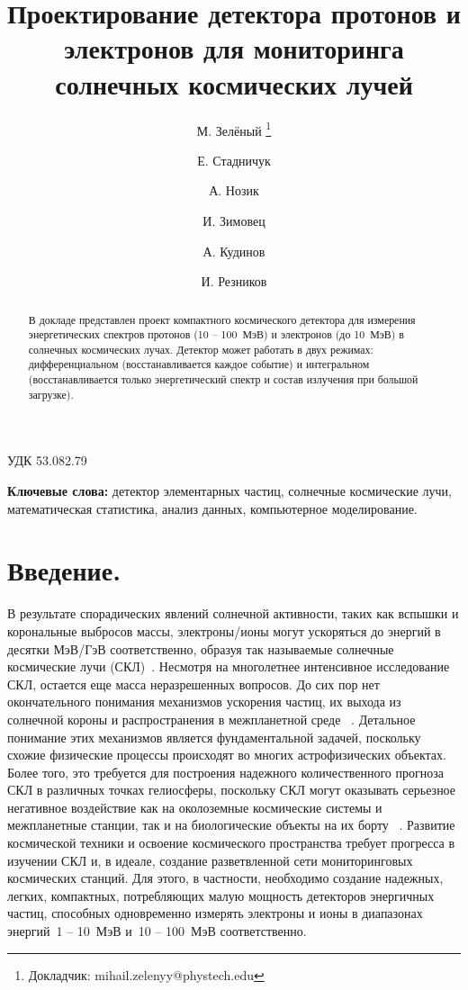 \documentclass[12pt, a4paper, notitlepage, onecolumn]{article}
\begin{document}
\begin{flushright}
УДК {53.082.79}
\end{flushright}
\title{Проектирование детектора протонов и электронов для мониторинга солнечных космических лучей}
\author[1,2,3]{М. Зелёный%
  \thanks{Докладчик: mihail.zelenyy@phystech.edu}}
\author[1,2]{Е. Стадничук}
\author[1,2]{А. Нозик}
\author[3]{И. Зимовец}
\author[1]{А. Кудинов}
\author[1]{И. Резников}
%
%

\date{}
{\let\newpage\relax\maketitle}

\begin{abstract}
В докладе представлен проект компактного космического детектора для измерения энергетических спектров протонов (10 -- 100~МэВ) и электронов (до 10~МэВ) в солнечных космических лучах. Детектор может работать в двух режимах: дифференциальном (восстанавливается каждое событие) и интегральном (восстанавливается только энергетический спектр и состав излучения при большой загрузке).
\end{abstract}

{\noindent \bf Ключевые слова:} детектор элементарных частиц, солнечные космические лучи, математическая статистика, анализ данных, компьютерное моделирование. 


\section*{Введение.} 
В результате спорадических явлений солнечной активности, таких как вспышки и корональные выбросов массы, электроны/ионы могут ускоряться до энергий в десятки МэВ/ГэВ соответственно, образуя так называемые  солнечные космические лучи (СКЛ)~\cite{miroshnichenko2015solar}. Несмотря на многолетнее интенсивное исследование СКЛ, остается еще масса неразрешенных вопросов. До сих пор нет окончательного понимания механизмов ускорения частиц, их выхода из солнечной короны и распространения в межпланетной среде ~\cite{miroshnichenko2015solar}. Детальное понимание этих механизмов является фундаментальной задачей, поскольку схожие физические процессы происходят во многих астрофизических объектах. Более того, это требуется для построения надежного количественного прогноза СКЛ в различных точках гелиосферы, поскольку СКЛ могут оказывать серьезное негативное воздействие как на околоземные космические системы и межпланетные станции, так и на биологические объекты на их борту ~\cite{petrukovich2008cosmic}. Развитие космической техники и освоение космического пространства требует прогресса в изучении СКЛ и, в идеале, создание разветвленной сети мониторинговых космических станций. Для этого, в частности, необходимо создание надежных, легких, компактных, потребляющих малую мощность детекторов энергичных частиц, способных одновременно измерять электроны и ионы в диапазонах энергий~1 -- 10~МэВ и~10 -- 100~МэВ соответственно. 
\end{document}

